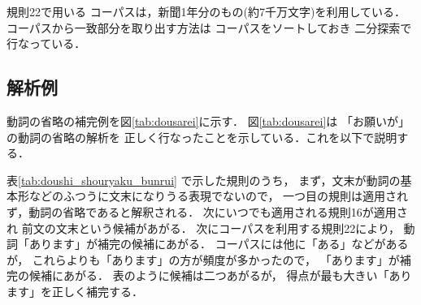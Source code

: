 規則22で用いる
コーパスは，新聞1年分のもの(約7千万文字)を利用している．
コーパスから一致部分を取り出す方法は
コーパスをソートしておき
二分探索で行なっている．


\subsection{解析例}

動詞の省略の補完例を図\ref{tab:dousarei}に示す．
図\ref{tab:dousarei}は
「お願いが」の動詞の省略の解析を
正しく行なったことを示している．これを以下で説明する．

\begin{figure}[t]
\end{figure}

表\ref{tab:doushi_shouryaku_bunrui}
で示した規則のうち，
まず，文末が動詞の基本形などのふつうに文末になりうる表現でないので，
一つ目の規則は適用されず，動詞の省略であると解釈される．
次にいつでも適用される規則16が適用され
前文の文末という候補があがる．
次にコーパスを利用する規則22により，
動詞「あります」が補完の候補にあがる．
コーパスには他に「ある」などがあるが，
これらよりも「あります」の方が頻度が多かったので，
「あります」が補完の候補にあがる．
表のように候補は二つあがるが，
得点が最も大きい「あります」を正しく補完する．

